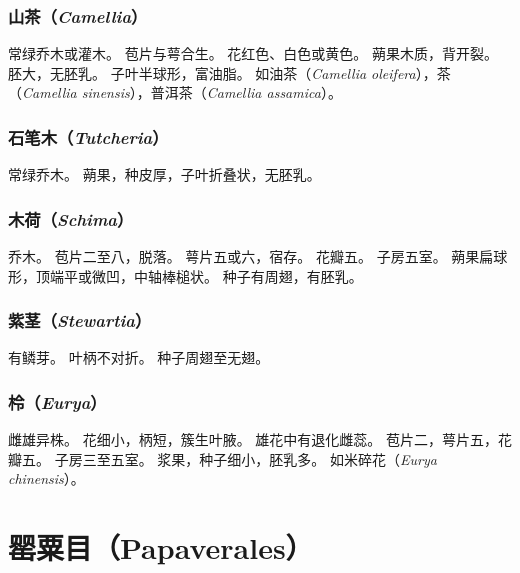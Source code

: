 \documentclass[11pt]{article}
\begin{document}
\begin{sloppypar}
\subsubsection{山茶（\textit{Camellia}）}
常绿乔木或灌木。
苞片与萼合生。
花红色、白色或黄色。
蒴果木质，背开裂。
胚大，无胚乳。
子叶半球形，富油脂。
如油茶（\textit{Camellia oleifera}），茶（\textit{Camellia sinensis}），普洱茶（\textit{Camellia assamica}）。

\subsubsection{石笔木（\textit{Tutcheria}）}
常绿乔木。
蒴果，种皮厚，子叶折叠状，无胚乳。

\subsubsection{木荷（\textit{Schima}）}
乔木。
苞片二至八，脱落。
萼片五或六，宿存。
花瓣五。
子房五室。
蒴果扁球形，顶端平或微凹，中轴棒槌状。
种子有周翅，有胚乳。

\subsubsection{紫茎（\textit{Stewartia}）}
有鳞芽。
叶柄不对折。
种子周翅至无翅。

\subsubsection{柃（\textit{Eurya}）}
雌雄异株。
花细小，柄短，簇生叶腋。
雄花中有退化雌蕊。
苞片二，萼片五，花瓣五。
子房三至五室。
浆果，种子细小，胚乳多。
如米碎花（\textit{Eurya chinensis}）。

\section{罂粟目（Papaverales）}





\end{sloppypar}
\end{document}
